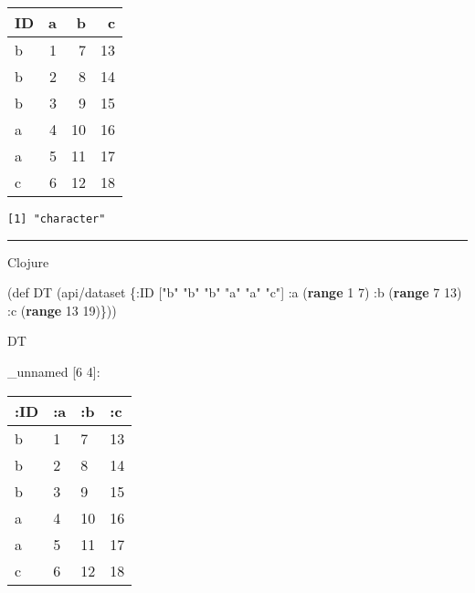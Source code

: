 \documentclass[]{article}
\newenvironment{Shaded}{\begin{snugshade}}{\end{snugshade}}
\newcommand{\AttributeTok}[1]{\textcolor[rgb]{0.77,0.63,0.00}{#1}}
\newcommand{\BuiltInTok}[1]{#1}
\newcommand{\DecValTok}[1]{\textcolor[rgb]{0.00,0.00,0.81}{#1}}
\newcommand{\FunctionTok}[1]{\textcolor[rgb]{0.00,0.00,0.00}{#1}}
\newcommand{\KeywordTok}[1]{\textcolor[rgb]{0.13,0.29,0.53}{\textbf{#1}}}
\newcommand{\NormalTok}[1]{#1}
\newcommand{\OperatorTok}[1]{\textcolor[rgb]{0.81,0.36,0.00}{\textbf{#1}}}
\newcommand{\StringTok}[1]{\textcolor[rgb]{0.31,0.60,0.02}{#1}}
\begin{document}
\begin{longtable}[]{@{}lrrr@{}}
\toprule
ID & a & b & c\tabularnewline
\midrule
\endhead
b & 1 & 7 & 13\tabularnewline
b & 2 & 8 & 14\tabularnewline
b & 3 & 9 & 15\tabularnewline
a & 4 & 10 & 16\tabularnewline
a & 5 & 11 & 17\tabularnewline
c & 6 & 12 & 18\tabularnewline
\bottomrule
\end{longtable}

\begin{Shaded}
\end{Shaded}

\begin{verbatim}
[1] "character"
\end{verbatim}

\begin{center}\rule{0.5\linewidth}{0.5pt}\end{center}

Clojure

\begin{Shaded}
\begin{Highlighting}[]
\NormalTok{(}\BuiltInTok{def}\FunctionTok{ DT }\NormalTok{(api/dataset \{}\AttributeTok{:ID}\NormalTok{ [}\StringTok{"b"} \StringTok{"b"} \StringTok{"b"} \StringTok{"a"} \StringTok{"a"} \StringTok{"c"}\NormalTok{]}
                      \AttributeTok{:a}\NormalTok{ (}\KeywordTok{range} \DecValTok{1} \DecValTok{7}\NormalTok{)}
                      \AttributeTok{:b}\NormalTok{ (}\KeywordTok{range} \DecValTok{7} \DecValTok{13}\NormalTok{)}
                      \AttributeTok{:c}\NormalTok{ (}\KeywordTok{range} \DecValTok{13} \DecValTok{19}\NormalTok{)\}))}
\end{Highlighting}
\end{Shaded}

\begin{Shaded}
\begin{Highlighting}[]
\NormalTok{DT}
\end{Highlighting}
\end{Shaded}

\_unnamed {[}6 4{]}:

\begin{longtable}[]{@{}llll@{}}
\toprule
:ID & :a & :b & :c\tabularnewline
\midrule
\endhead
b & 1 & 7 & 13\tabularnewline
b & 2 & 8 & 14\tabularnewline
b & 3 & 9 & 15\tabularnewline
a & 4 & 10 & 16\tabularnewline
a & 5 & 11 & 17\tabularnewline
c & 6 & 12 & 18\tabularnewline
\bottomrule
\end{longtable}
\end{document}
